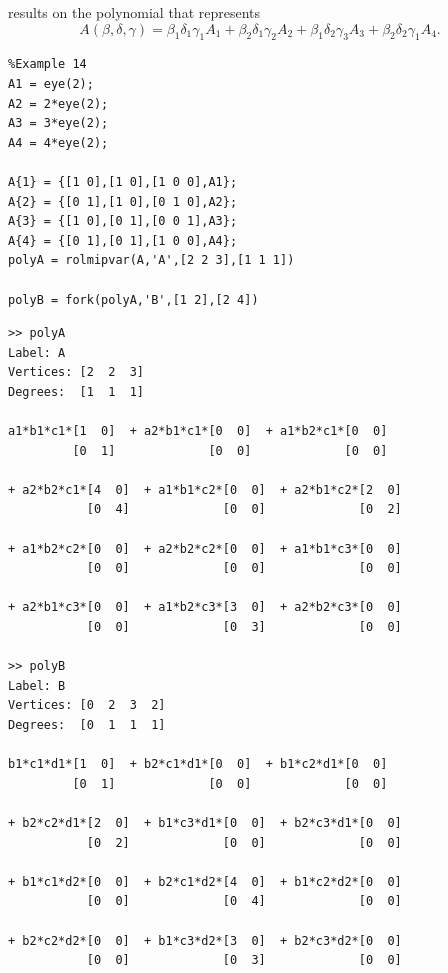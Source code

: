 \documentclass[english,11pt]{article}
\theoremstyle{break} \theorembodyfont{\small\rm}
\begin{document}
results on the polynomial 
that represents
\[
 A(\beta,\delta,\gamma) = \beta_1 \delta_1 \gamma_1 A_1 + \beta_2 \delta_1 \gamma_2 A_2  + \beta_1 \delta_2 \gamma_3 A_3 + \beta_2 \delta_2 \gamma_1 A_4.
\]

\begin{minipage}{9.5cm}
 \begin{lstlisting}
%Example 14
A1 = eye(2);
A2 = 2*eye(2);
A3 = 3*eye(2);
A4 = 4*eye(2);

A{1} = {[1 0],[1 0],[1 0 0],A1};
A{2} = {[0 1],[1 0],[0 1 0],A2};
A{3} = {[1 0],[0 1],[0 0 1],A3};
A{4} = {[0 1],[0 1],[1 0 0],A4};
polyA = rolmipvar(A,'A',[2 2 3],[1 1 1])

polyB = fork(polyA,'B',[1 2],[2 4])
 \end{lstlisting}
\end{minipage}
\vspace{0.2cm}

\begin{minipage}{15.5cm}
\begin{lstlisting}[rulecolor=\color{red}]
>> polyA
Label: A
Vertices: [2  2  3]
Degrees:  [1  1  1]
 
a1*b1*c1*[1  0]  + a2*b1*c1*[0  0]  + a1*b2*c1*[0  0]  
         [0  1]             [0  0]             [0  0]  
         
+ a2*b2*c1*[4  0]  + a1*b1*c2*[0  0]  + a2*b1*c2*[2  0]       
           [0  4]             [0  0]             [0  2]       
         
+ a1*b2*c2*[0  0]  + a2*b2*c2*[0  0]  + a1*b1*c3*[0  0]               
           [0  0]             [0  0]             [0  0]               
         
+ a2*b1*c3*[0  0]  + a1*b2*c3*[3  0]  + a2*b2*c3*[0  0]          
           [0  0]             [0  3]             [0  0] 
           
>> polyB
Label: B
Vertices: [0  2  3  2]
Degrees:  [0  1  1  1]
 
b1*c1*d1*[1  0]  + b2*c1*d1*[0  0]  + b1*c2*d1*[0  0]  
         [0  1]             [0  0]             [0  0]  
         
+ b2*c2*d1*[2  0]  + b1*c3*d1*[0  0]  + b2*c3*d1*[0  0]          
           [0  2]             [0  0]             [0  0]          
         
+ b1*c1*d2*[0  0]  + b2*c1*d2*[4  0]  + b1*c2*d2*[0  0]          
           [0  0]             [0  4]             [0  0]          
         
+ b2*c2*d2*[0  0]  + b1*c3*d2*[3  0]  + b2*c3*d2*[0  0]            
           [0  0]             [0  3]             [0  0]            
\end{lstlisting}
\end{minipage}
\vspace{0.2cm}
\end{document}

